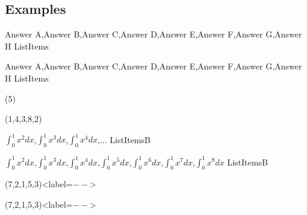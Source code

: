 \documentclass[english,11pt,a4paper]{article}
\begin{document}
\subsection{Examples}

\begin{codehigh}[language=latex/latex3,style/main=teal!25,style/code=teal!25]
\CreateItemsList%
    {Answer A,Answer B,Answer C,Answer D,Answer E,Answer F,Answer G,Answer H}%
    {\mylistofitems}{ListItems}
\end{codehigh}

\CreateItemsList%
{Answer A,Answer B,Answer C,Answer D,Answer E,Answer F,Answer G,Answer H}%
{\mylistofitems}{ListItems}

\begin{demohigh}[language=latex/latex3,style/main=teal!25,style/code=teal!25]
(5)
\end{demohigh}

\begin{demohigh}[language=latex/latex3,style/main=teal!25,style/code=teal!25]
(1,4,3,8,2)
\end{demohigh}

\begin{codehigh}[language=latex/latex3,style/main=teal!25,style/code=teal!25]
\CreateItemsList%
    {{$\int_0^1 x^2 dx$},{$\int_0^1 x^3 dx$},{$\int_0^1 x^4 dx$},...}%
    {\mylistofitemsb}{ListItemsB}
\end{codehigh}

\CreateItemsList%
{{$\int_0^1 x^2 dx$},{$\int_0^1 x^3 dx$},{$\int_0^1 x^4 dx$},{$\int_0^1 x^5 dx$},{$\int_0^1 x^6 dx$},{$\int_0^1 x^7 dx$},{$\int_0^1 x^8 dx$}}%
{\mylistofitemsb}{ListItemsB}

\begin{codehigh}[language=latex/latex3,style/main=teal!25,style/code=teal!25]
(7,2,1,5,3)<label=$--$>
\end{codehigh}

(7,2,1,5,3)<label=$--$>
\end{document}
